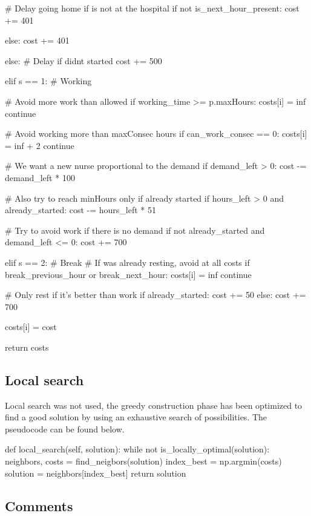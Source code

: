 \documentclass[12pt,a4paper]{article}
\begin{document}
\begin{pycode}
					# Delay going home if is not at the hospital
					if not is_next_hour_present:
						cost += 401

					else:
						cost += 401

				else:
					# Delay if didnt started
					cost += 500

			elif s == 1: # Working

				# Avoid more work than allowed
				if working_time >= p.maxHours:
					costs[i] = inf
					continue

				# Avoid working more than maxConsec hours
				if can_work_consec == 0:
					costs[i] = inf + 2
					continue

				# We want a new nurse proportional to the demand
				if demand_left > 0:
					cost -= demand_left * 100

				# Also try to reach minHours only if already started
				if hours_left > 0 and already_started:
					cost -= hours_left * 51

				# Try to avoid work if there is no demand
				if not already_started and demand_left <= 0:
					cost += 700

			elif s == 2: # Break
				# If was already resting, avoid at all costs
				if break_previous_hour or break_next_hour:
					costs[i] = inf
					continue

				# Only rest if it's better than work
				if already_started:
					cost += 50
				else:
					cost += 700

			costs[i] = cost

		return costs
\end{pycode}


\subsection{Local search}
%
Local search was not used, the greedy construction phase has been optimized to 
find a good solution by using an exhaustive search of possibilities. The 
pseudocode can be found below.
%
\begin{pycode}
def local_search(self, solution):
	while not is_locally_optimal(solution):
		neighbors, costs = find_neigbors(solution)
		index_best = np.argmin(costs)
		solution = neighbors[index_best]
	return solution
\end{pycode}
%

\subsection{Comments}
\end{document}
